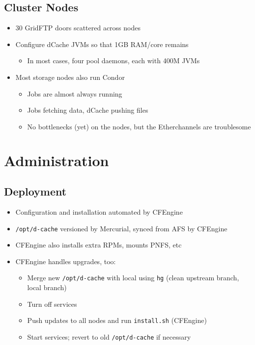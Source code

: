 \documentclass{beamer}
\begin{document}
\subsection{Cluster Nodes}
\begin{frame}
\begin{itemize}
	\item 30 GridFTP doors scattered across nodes
	\item Configure dCache JVMs so that 1GB RAM/core remains
	\begin{itemize}
		\item In most cases, four pool daemons, each with 400M JVMs
	\end{itemize}
	\item Most storage nodes also run Condor
	\begin{itemize}
		\item Jobs are almost always running
		\item Jobs fetching data, dCache pushing files
		\item No bottlenecks (yet) on the nodes, but the Etherchannels are troublesome
	\end{itemize}
\end{itemize}
\end{frame}

\section{Administration}
\subsection{Deployment}
\begin{frame}
\begin{itemize}
	\item Configuration and installation automated by CFEngine
	\item {\tt /opt/d-cache} versioned by Mercurial, synced from AFS by CFEngine
	\item CFEngine also installs extra RPMs, mounts PNFS, etc
	\item CFEngine handles upgrades, too:
	\begin{itemize}
		\item Merge new {\tt /opt/d-cache} with local using {\tt hg} (clean upstream branch, local branch)
		\item Turn off services
		\item Push updates to all nodes and run {\tt install.sh} (CFEngine)
		\item Start services; revert to old {\tt /opt/d-cache} if necessary
	\end{itemize}
\end{itemize}
\end{frame}
\end{document}
